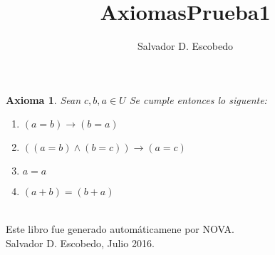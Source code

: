 ﻿\documentclass[12pt]{book}
\title{AxiomasPrueba1}
\author{Salvador D. Escobedo}
\date{}
\newtheorem{axiom}{Axioma}[chapter]
\begin{document}
\maketitle

\begin{axiom}
Sean $c,b,a\in U$
Se cumple entonces lo siguente: 
\begin{enumerate}
\item $(a=b)\rightarrow (b=a)$
\item $((a=b)\wedge (b=c))\rightarrow (a=c)$
\item $a=a$
\item $(a+b)=(b+a)$
\end{enumerate}
\label{ax: 0}
\end{axiom}
\\\small{Este libro fue generado automáticamene por NOVA.} \\
\small{Salvador D. Escobedo, Julio 2016}.
\end{document}
